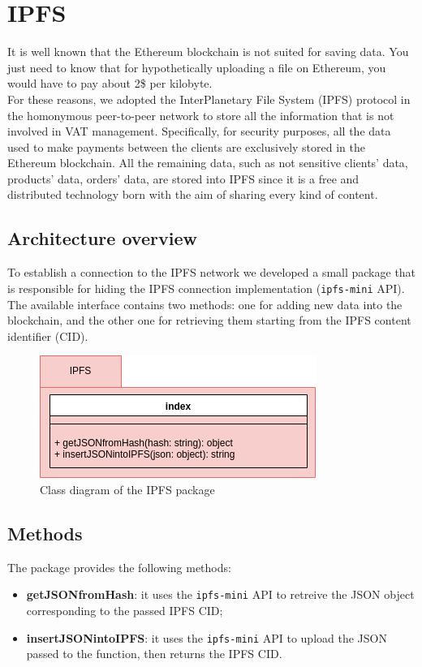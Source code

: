 \section{IPFS} 

It is well known that the Ethereum blockchain is not suited for saving data. You just need to know that for hypothetically uploading a file on Ethereum, you would have to pay about 2\$ per kilobyte. 
\\
For these reasons, we adopted the InterPlanetary File System (IPFS) protocol in the homonymous peer-to-peer network to store all the information that is not involved in VAT management. Specifically, for security purposes, all the data used to make payments between the clients are exclusively stored in the Ethereum blockchain. All the remaining data, such as not sensitive clients' data, products' data, orders' data, are stored into IPFS since it is a free and distributed technology born with the aim of sharing every kind of content.

\subsection{Architecture overview}

To establish a connection to the IPFS network we developed a small package that is responsible for hiding the IPFS connection implementation (\texttt{ipfs-mini} API). The available interface contains two methods: one for adding new data into the blockchain, and the other one for retrieving them starting from the IPFS content identifier (CID).
\begin{figure}[h]
	\centering
	\includegraphics[scale=0.6]{res/images/IPFS.png}
	\caption{Class diagram of the IPFS package}
\end{figure}
\subsection{Methods}
The package provides the following methods:
\begin{itemize}
	\item \textbf{getJSONfromHash}: it uses the \texttt{ipfs-mini} API to retreive the JSON object corresponding to the passed IPFS CID;
	\item \textbf{insertJSONintoIPFS}: it uses the \texttt{ipfs-mini} API to upload the JSON passed to the function, then returns the IPFS CID.
\end{itemize}

